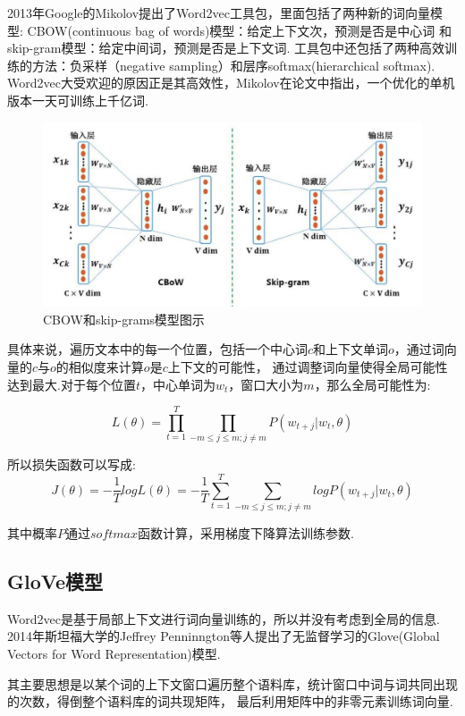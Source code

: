 \documentclass[bachelor,winfonts]{jnuthesis}
\begin{document}
2013年Google的Mikolov提出了Word2vec工具包，里面包括了两种新的词向量模型:
CBOW(continuous bag of words)模型：给定上下文次，预测是否是中心词
和skip-gram模型：给定中间词，预测是否是上下文词.
工具包中还包括了两种高效训练的方法：负采样（negative sampling）和层序softmax(hierarchical softmax).
Word2vec大受欢迎的原因正是其高效性，Mikolov在论文中指出，一个优化的单机版本一天可训练上千亿词.

\begin{figure}[h!]
  \centering
  \includegraphics[width=0.6\linewidth]{CBOW-skip-gram.png}
  \caption{CBOW和skip-grams模型图示}
\end{figure}

具体来说，遍历文本中的每一个位置，包括一个中心词$c$和上下文单词$o$，通过词向量的$c$与$o$的相似度来计算$o$是$c$上下文的可能性，
通过调整词向量使得全局可能性达到最大.对于每个位置$t$，中心单词为$w_{t}$，窗口大小为$m$，那么全局可能性为:

\begin{equation}
  L(\theta) = \prod_{t=1}^{T} \prod_{-m \le j \le m ;j \neq m} P(w_{t+j}|w_{t},\theta)
\end{equation}

所以损失函数可以写成:
\begin{equation}
  J(\theta) = -\frac{1}{T}logL(\theta) = -\frac{1}{T} \sum_{t=1}^{T} \sum_{-m \le j \le m ;j \neq m} log P(w_{t+j}|w_{t},\theta)
\end{equation}

其中概率$P$通过$softmax$函数计算，采用梯度下降算法训练参数.

\subsection{GloVe模型}
Word2vec是基于局部上下文进行词向量训练的，所以并没有考虑到全局的信息.
2014年斯坦福大学的Jeffrey Penninngton等人提出了无监督学习的Glove(Global Vectors for Word Representation)模型.

其主要思想是以某个词的上下文窗口遍历整个语料库，统计窗口中词与词共同出现的次数，得倒整个语料库的词共现矩阵，
最后利用矩阵中的非零元素训练词向量.
\end{document}
